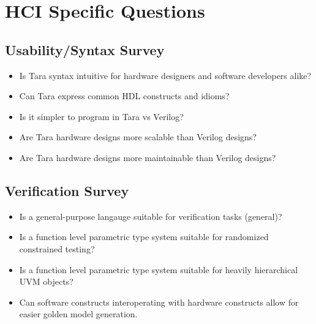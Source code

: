 \documentclass[10pt]{article}
\begin{document}
\section{HCI Specific Questions}

\subsection{Usability/Syntax Survey}
\begin{itemize}
	\item Is Tara syntax intuitive for hardware designers and software developers alike?
	\item Can Tara express common HDL constructs and idioms?
	\item Is it simpler to program in Tara vs Verilog?
	\item Are Tara hardware designs more scalable than Verilog designs?
	\item Are Tara hardware designs more maintainable than Verilog designs?
\end{itemize}

\subsection{Verification Survey}
\begin{itemize}
	\item Is a general-purpose langauge suitable for verification tasks (general)?
	\item Is a function level parametric type system suitable for randomized constrained testing?
	\item Is a function level parametric type system suitable for heavily hierarchical UVM objects?
	\item Can software constructs interoperating with hardware constructs allow for easier golden model generation.
\end{itemize}
\end{document}
